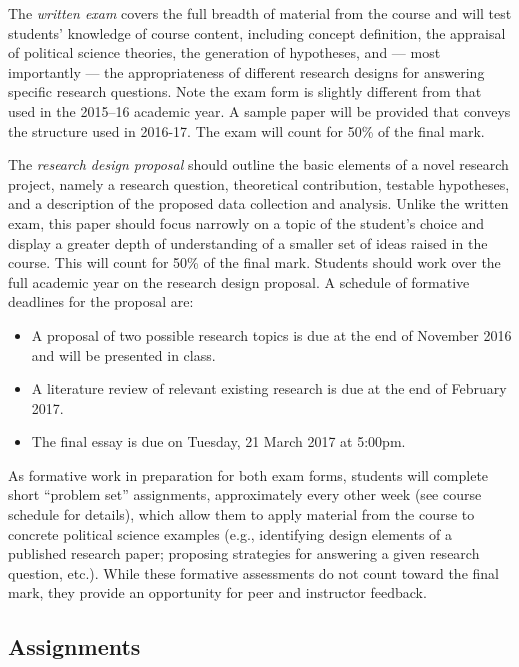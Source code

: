 \documentclass[12pt,a4paper]{article}
\begin{document}
The \textit{written exam} covers the full breadth of material from the course and will test students' knowledge of course content, including concept definition, the appraisal of political science theories, the generation of hypotheses, and --- most importantly --- the appropriateness of different research designs for answering specific research questions. Note the exam form is slightly different from that used in the 2015--16 academic year. A sample paper will be provided that conveys the structure used in 2016-17. The exam will count for 50\% of the final mark.

The \textit{research design proposal} should outline the basic elements of a novel research project, namely a research question, theoretical contribution, testable hypotheses, and a description of the proposed data collection and analysis. Unlike the written exam, this paper should focus narrowly on a topic of the student's choice and display a greater depth of understanding of a smaller set of ideas raised in the course. This will count for 50\% of the final mark. Students should work over the full academic year on the research design proposal. A schedule of formative deadlines for the proposal are:

\begin{itemize}
\item A proposal of two possible research topics is due at the end of November 2016 and will be presented in class.
\item A literature review of relevant existing research is due at the end of February 2017.
\item The final essay is due on Tuesday, 21 March 2017 at 5:00pm.
\end{itemize}

As formative work in preparation for both exam forms, students will complete short ``problem set'' assignments, approximately every other week (see course schedule for details), which allow them to apply material from the course to concrete political science examples (e.g., identifying design elements of a published research paper; proposing strategies for answering a given research question, etc.). While these formative assessments do not count toward the final mark, they provide an opportunity for peer and instructor feedback.

\subsection{Assignments}
\end{document}
